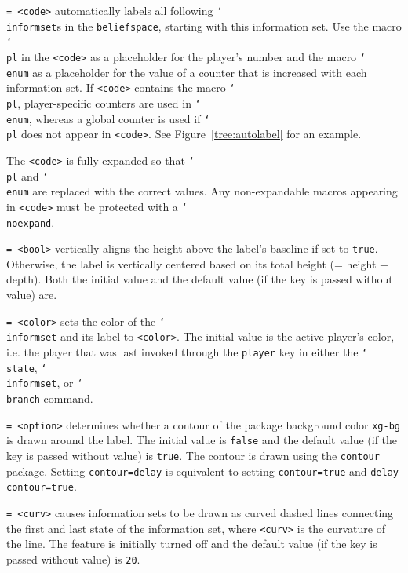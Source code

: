 \documentclass{article}
\newenvironment{desc}{\itemize[leftmargin=50pt]}{\enditemize}
\def\option#1#2{\item[\texttt{#1}] \hskip-1.5pt\texttt{#2}}
\renewcommand{\textbackslash}{\char`\\}
\def\cmd#1{\texttt{\color{cmd}\textbackslash#1}}
\begin{document}
\begin{desc}
\option{autolabel}{= <code>} automatically labels all following \cmd{informset}s in the \texttt{beliefspace}, starting with this information set. Use the macro \cmd{pl} in the \texttt{<code>} as a placeholder for the player's number and the macro \cmd{enum} as a placeholder for the value of a counter that is increased with each information set. If \texttt{<code>} contains the macro \cmd{pl}, player-specific counters are used in \cmd{enum}, whereas a global counter is used if \cmd{pl} does not appear in \texttt{<code>}. See Figure~\ref{tree:autolabel} for an example.

{\color{player4}The \texttt{<code>} is fully expanded so that \cmd{pl} and \cmd{enum} are replaced with the correct values. Any non-expandable macros appearing in \texttt{<code>} must be protected with a \cmd{noexpand}.}

\option{base line}{= <bool>} vertically aligns the height above the label's baseline if set to \texttt{true}. Otherwise, the label is vertically centered based on its total height (= height + depth). Both the initial value and the default value (if the key is passed without value) are.

\option{color}{= <color>} sets the color of the \cmd{informset} and its label to \texttt{<color>}. The initial value is the active player's color, i.e. the player that was last invoked through the \texttt{player} key in either the \cmd{state}, \cmd{informset}, or \cmd{branch} command.
%

\option{contour}{= <option>} determines whether a contour of the package background color \texttt{xg-bg} is drawn around the label. The initial value is \texttt{false} and the default value (if the key is passed without value) is \texttt{true}. The contour is drawn using the \texttt{contour} package. Setting \texttt{contour=delay} is equivalent to setting \texttt{contour=true} and \texttt{delay contour=true}.


\option{curved}{= <curv>} causes information sets to be drawn as curved dashed lines connecting the first and last state of the information set, where \texttt{<curv>} is the curvature of the line. The feature is initially turned off and the default value (if the key is passed without value) is \texttt{20}.


\end{desc}
\end{document}
